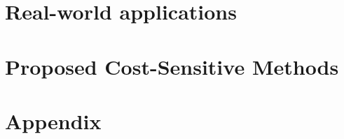 \documentclass[twoside,openright,titlepage,numbers=noenddot,headinclude,%
               footinclude=true,cleardoublepage=empty,abstractoff,BCOR=5mm,%
               paper=a4,fontsize=12pt,ngerman,american]{scrreprt} %
\numberwithin{theorem}{chapter}
\numberwithin{definition}{chapter}
\numberwithin{algorithm}{chapter}
\numberwithin{figure}{chapter}
\numberwithin{table}{chapter}
\numberwithin{equation}{chapter}
\begin{document}
\frenchspacing
\raggedbottom
{}
\pagestyle{plain}



\cleardoublepage
\cleardoublepage
\cleardoublepage
\cleardoublepage
\cleardoublepage
\pagestyle{scrheadings}
\cleardoublepage



\cleardoublepage
\cleardoublepage

\part{Real-world applications}\label{part:1}

  \cleardoublepage
  \cleardoublepage

\part{Proposed Cost-Sensitive Methods}\label{part:2}

  \cleardoublepage
  \cleardoublepage
  \cleardoublepage
  \cleardoublepage
  \cleardoublepage

\cleardoublepage
\makeatletter
\def\toclevel@chapter{-1}
\makeatother
    



\appendix
\cleardoublepage
\part{Appendix}

\cleardoublepage
\cleardoublepage
		
\end{document}
